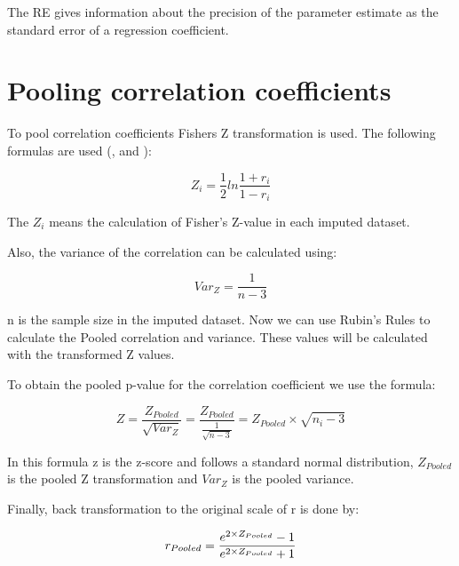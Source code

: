 \documentclass[
]{book}
\begin{document}
The RE gives information about the precision of the parameter estimate as the standard error of a regression coefficient.

\hypertarget{pooling-correlation-coefficients-1}{%
\chapter{Pooling correlation coefficients}\label{pooling-correlation-coefficients-1}}

To pool correlation coefficients Fishers Z transformation is used. The following formulas are used (\citet{raghunathan2016}, \citet{VanBuuren2018} and \citet{enders2010applied}):

\begin{equation}
Z_i = \frac{1}{2}ln\frac{1+r_i}{1-r_i}
  \label{eq:cor}
\end{equation}

The \({Z_i}\) means the calculation of Fisher's Z-value in each imputed dataset.

Also, the variance of the correlation can be calculated using:

\begin{equation}
Var_Z=\frac{1}{n-3}
  \label{eq:var-cor}
\end{equation}

n is the sample size in the imputed dataset. Now we can use Rubin's Rules to calculate the Pooled correlation and variance. These values will be calculated with the transformed Z values.

To obtain the pooled p-value for the correlation coefficient we use the formula:

\begin{equation}
Z=\frac{Z_{Pooled}}{\sqrt{Var_Z}} = \frac{Z_{Pooled}}{\frac{1}{\sqrt{n-3}}}=Z_{Pooled}\times\sqrt{n_i-3}
  \label{eq:z-cor}
\end{equation}

In this formula z is the z-score and follows a standard normal distribution, \(Z_{Pooled}\) is the pooled Z transformation and \(Var_Z\) is the pooled variance.

Finally, back transformation to the original scale of r is done by:

\begin{equation}
r_{Pooled} = \frac{e^{2\times\\Z_{Pooled}}-1}{e^{2\times\\Z_{Pooled}}+1}
  \label{eq:exp-cor}
\end{equation}
\end{document}
